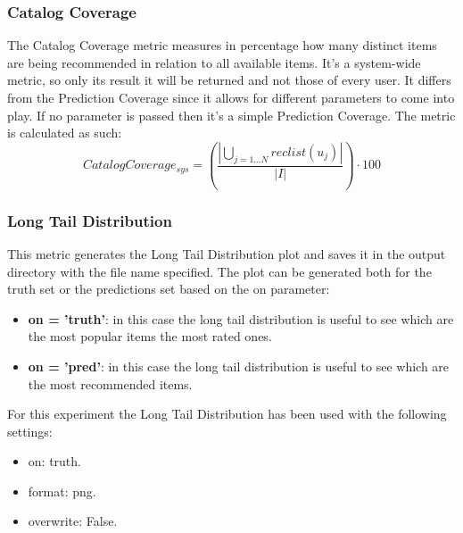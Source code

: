 \documentclass[11pt]{article}
\begin{document}

\subsubsection{Catalog Coverage}\label{subsubsec:cat_cov}
The Catalog Coverage metric measures in percentage how many distinct items are being recommended in relation
to all available items.
It's a system-wide metric, so only its result it will be returned and not those of every user.
It differs from the Prediction Coverage since it allows for different parameters to come into play.
If no parameter is passed then it's a simple Prediction Coverage.
The metric is calculated as such:
\hfill\break
\hfill\break
    \[
         Catalog Coverage_{sys} = (\frac{|\bigcup_{j=1...N}reclist(u_j)|}{|I|})\cdot100
    \]
\hfill\break



\subsubsection{Long Tail Distribution}\label{subsubsec:ltd}
This metric generates the Long Tail Distribution plot and saves it in the output directory with the file name
specified.
The plot can be generated both for the truth set or the predictions set based on the on parameter:
\begin{itemize}
    \item \textbf{on = 'truth'}: in this case the long tail distribution is useful to see which are the most popular items
       the most rated ones.
    \item \textbf{on = 'pred'}: in this case the long tail distribution is useful to see which are the most recommended
        items.
\end{itemize}

\hfill\break
For this experiment the Long Tail Distribution has been used with the following settings:
\begin{itemize}
    \item on: truth.
    \item format: png.
    \item overwrite: False.
\end{itemize}
\hfill\break
\end{document}
